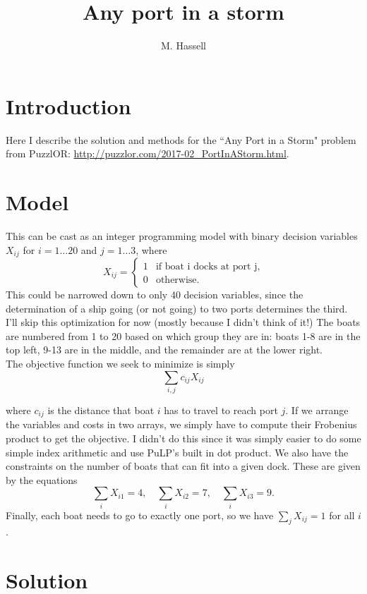 \documentclass[12pt,english]{article}
\title{Any port in a storm}
\author{M. Hassell}
\begin{document}
\maketitle

\section{Introduction}

Here I describe the solution and methods for the ``Any Port in a Storm" problem from PuzzlOR: \url{http://puzzlor.com/2017-02_PortInAStorm.html}.

\section{Model}

This can be cast as an integer programming model with binary decision variables $X_{ij}$ for $i = 1\dots 20$ and $j = 1 \dots 3$, where
$$
X_{ij} =
\left\{
\begin{array}{cc}
1 	&  \text{if boat i docks at port j}, \\
0 	&  \text{otherwise}.
\end{array}
\right.
$$
This could be narrowed down to only 40 decision variables, since the determination of a ship going (or not going) to two ports determines the third.  I'll skip this optimization for now (mostly because I didn't think of it!) The boats are numbered from 1 to 20 based on which group they are in: boats 1-8 are in the top left, 9-13 are in the middle, and the remainder are at the lower right.\\

The objective function we seek to minimize is simply
$$
\sum_{i,j} c_{ij} X_{ij}
$$

where $c_{ij}$ is the distance that boat $i$ has to travel to reach port $j$.  If we arrange the variables and costs in two arrays, we simply have to compute their Frobenius product to get the objective.  I didn't do this since it was simply easier to do some simple index arithmetic and use PuLP's built in dot product.  We also have the constraints on the number of boats that can fit into a given dock.  These are given by the equations
$$
\sum_i X_{i1} = 4, \quad \sum_i X_{i2} = 7, \quad \sum_i X_{i3} = 9.
$$
Finally, each boat needs to go to exactly one port, so we have $\sum_j X_{ij} = 1$ for all $i$.

\section{Solution}
\end{document}
